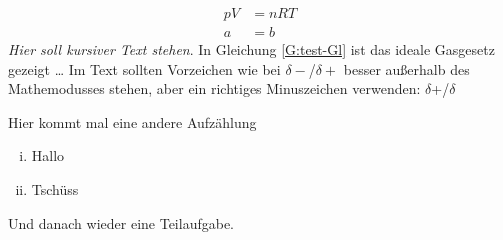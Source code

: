 \documentclass[./main.tex]{subfiles}
\begin{document}
\begin{align}
    pV &= nRT \label{G:test-Gl}\\
    a &= b
\end{align}
\textit{Hier soll kursiver Text stehen}.
In Gleichung \ref{G:test-Gl} ist das ideale Gasgesetz gezeigt \ldots 
Im Text sollten Vorzeichen wie bei $\delta-$/$\delta+$ besser au\ss{}erhalb des Mathemodusses stehen, aber ein richtiges Minuszeichen verwenden: $\delta$+/$\delta$\textminus{}

Hier kommt mal eine andere Aufz\"ahlung
\begin{enumerate}[(i)]
    \item Hallo
    \item Tsch\"uss
\end{enumerate}
Und danach wieder eine Teilaufgabe.

\aufgabenende
\end{document}

